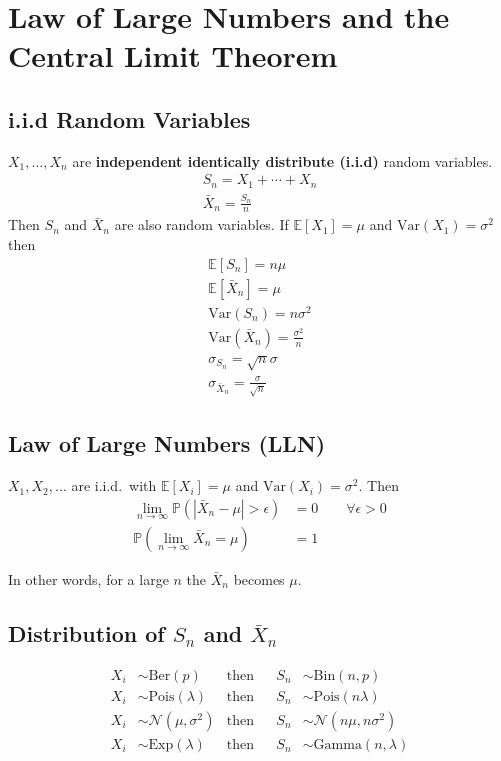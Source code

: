 \section{Law of Large Numbers and the Central Limit Theorem}

\subsection{i.i.d Random Variables}

$X_1, \ldots , X_n$ are \textbf{independent identically distribute (i.i.d)} random variables.
\begin{gather*}
    S_n = X_1 + \cdots + X_n \\
    \bar{X}_n = \frac{S_n}{n}
\end{gather*}
Then $S_n$ and $ \bar{X}_n$ are also random variables.
\newpar{}
If $\mathbb{E}[X_1]=\mu$ and $\mathrm{Var}(X_1)=\sigma^2$ then
\begin{gather*}
    \mathbb{E}[S_n]=n\mu \\
    \mathbb{E}[\bar{X}_n]=\mu \\
    \mathrm{Var}(S_n)=n\sigma^2 \\
    \mathrm{Var}(\bar{X}_n)=\frac{\sigma^2}{n} \\
    \sigma_{S_n}=\sqrt{n}\sigma \\
    \sigma_{\bar{X}_n}=\frac{\sigma}{\sqrt{n}}
\end{gather*}

\subsection{Law of Large Numbers (LLN)}
$X_1, X_2, \ldots$ are i.i.d.\ with $\mathbb{E}[X_i]=\mu$ and $\mathrm{Var}(X_i)=\sigma^2$. Then
\begin{align*}
    \lim_{n\to\infty}\mathbb{P}\left(\left|\bar{X}_n-\mu\right|>\epsilon\right) & =0 \qquad \forall \epsilon > 0 \\
    \mathbb{P}\left(\lim_{n\to\infty}\bar{X}_n=\mu\right)                       & =1
\end{align*}

In other words, for a large $n$ the $\bar{X}_n$ becomes $\mu$.

\subsection{Distribution of $S_n$ and $\bar{X}_n$}
\noindent\begin{align*}
    X_i & \sim \mathrm{Ber}(p)            & \text{then} &  & S_n & \sim \mathrm{Bin}(n,p)            \\
    X_i & \sim \mathrm{Pois}(\lambda)     & \text{then} &  & S_n & \sim \mathrm{Pois}(n\lambda)      \\
    X_i & \sim \mathcal{N}(\mu, \sigma^2) & \text{then} &  & S_n & \sim \mathcal{N}(n\mu, n\sigma^2) \\
    X_i & \sim \mathrm{Exp}(\lambda)      & \text{then} &  & S_n & \sim \mathrm{Gamma}(n, \lambda) 
\end{align*}

